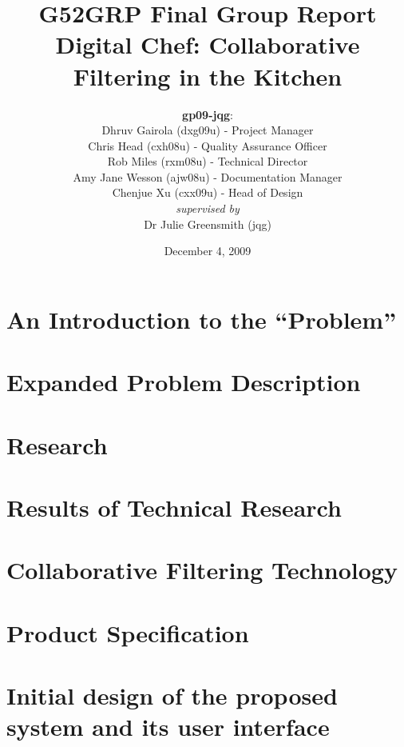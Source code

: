 \documentclass[12pt]{article}
\title{G52GRP Final Group Report \vspace{0.5em}\\
Digital Chef: Collaborative Filtering in the Kitchen}                     %
\author{\textbf{gp09-jqg}: \\
\newline
Dhruv Gairola (dxg09u) - Project Manager\\
Chris Head (cxh08u) - Quality Assurance Officer\\
Rob Miles (rxm08u) - Technical Director\\
Amy Jane Wesson (ajw08u) - Documentation Manager\\
Chenjue Xu (cxx09u) - Head of Design\\
\textit{supervised by} \\
Dr Julie Greensmith (jqg)
} %
\date{December 4, 2009}                                    %
\begin{document}
\maketitle                                              %
\newpage


\tableofcontents%

\newpage

\section{An Introduction to the ``Problem''}

\newpage

\section{Expanded Problem Description}

\newpage

\section{Research} %

\newpage

\section{Results of Technical Research}		%

\newpage

\section{Collaborative Filtering Technology}

\newpage

\section{Product Specification} 			%
\label{sec:productspec}

\newpage

\section{Initial design of the proposed system and its user interface}
\newpage
\end{document}
